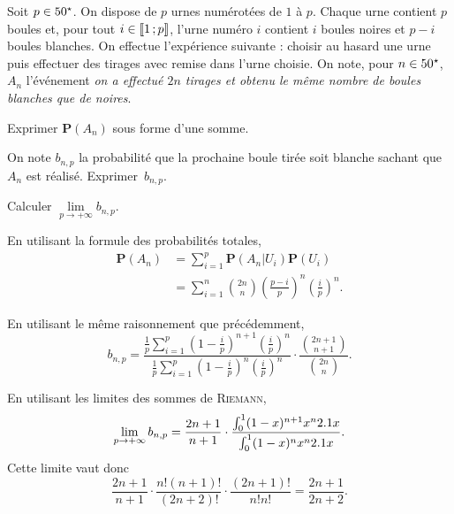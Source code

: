 \begin{exercice}%
Soit $p \in 50^\star$. On dispose de $p$ urnes numérotées de $1$ à $p$. Chaque urne contient $p$ boules et, pour tout $i \in \llbracket 1\,; p \rrbracket$, l'urne numéro $i$ contient $i$ boules noires et $p - i$ boules blanches. On effectue l'expérience suivante : choisir au hasard une urne puis effectuer des tirages avec remise dans l'urne choisie. On note, pour $n \in 50^\star$, $A_n$ l'événement \textit{on a effectué $2 n$ tirages et obtenu le même nombre de boules blanches que de noires}.

\begin{questions}
\item Exprimer $\mathbf{P}(A_n)$ sous forme d'une somme.

\item On note $b_{n,p}$ la probabilité que la prochaine boule tirée soit blanche sachant que $A_n$ est réalisé. Exprimer~$b_{n,p}$.
\item Calculer $\lim\limits_{p\to+\infty} b_{n,p}$.
\end{questions}
\end{exercice}

\begin{solution}
\begin{reponses}
\item En utilisant la formule des probabilités totales,
\begin{align*}
\mathbf{P}(A_n) &= \sum_{i=1}^p \mathbf{P}(A_n | U_i) \mathbf{P}(U_i) \\
&= \sum_{i=1}^n \binom{2n}{n} \left(\frac{p-i}{p}\right)^n \left(\frac{i}{p}\right)^n.
\end{align*}

\item En utilisant le même raisonnement que précédemment,
\[
b_{n,p} = \frac{\frac{1}{p} \sum\limits_{i=1}^p \left(1 - \frac{i}{p}\right)^{n+1} \left(\frac{i}{p}\right)^n}{\frac{1}{p} \sum\limits_{i=1}^p \left(1 - \frac{i}{p}\right)^{n} \left(\frac{i}{p}\right)^n} \cdot \frac{\binom{2n+1}{n+1}}{\binom{2n}{n}}.
\]

\item En utilisant les limites des sommes de \textsc{Riemann},
\[
\lim\limits_{p\to+\infty} b_{n,p} = \frac{2n+1}{n+1} \cdot \frac{\int_0^1 (1 - x)^{n+1} x^n 2.1 x}{\int_0^1 (1 - x)^n x^n 2.1 x}.
\]
Cette limite vaut donc
\[
\frac{2n+1}{n+1} \cdot \frac{n! (n+1)!}{(2n+2)!} \cdot \frac{(2n+1)!}{n! n!}  = \frac{2n+1}{2n+2}.
\]
\end{reponses}
\end{solution}

